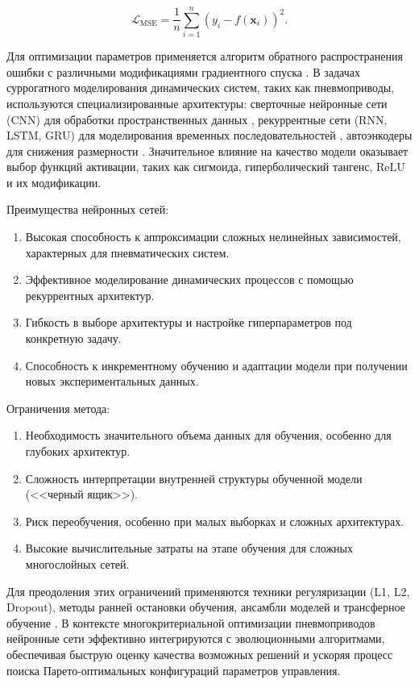 \begin{equation}
    \mathcal{L}_{\text{MSE}} = \frac{1}{n} \sum_{i=1}^{n} (y_i - f(\mathbf{x}_i))^2.
\end{equation}

Для оптимизации параметров применяется алгоритм обратного распространения ошибки с различными модификациями
градиентного спуска \cite{Ghojogh2024Learning}. В задачах суррогатного моделирования динамических систем,
таких как пневмоприводы, используются специализированные архитектуры: сверточные нейронные сети (CNN) для обработки
пространственных данных \cite{Zhu2021Spatial}, рекуррентные сети (RNN, LSTM, GRU) для моделирования временных
последовательностей \cite{Zarzycki2021LSTM}, автоэнкодеры для снижения размерности \cite{Kaur2021Variational}. Значительное
влияние на качество модели оказывает выбор функций активации, таких как сигмоида, гиперболический тангенс, ReLU и их
модификации.

Преимущества нейронных сетей:

\begin{enumerate}
    \item Высокая способность к аппроксимации сложных нелинейных зависимостей, характерных для пневматических систем.
    \item Эффективное моделирование динамических процессов с помощью рекуррентных архитектур.
    \item Гибкость в выборе архитектуры и настройке гиперпараметров под конкретную задачу.
    \item Способность к инкрементному обучению и адаптации модели при получении новых экспериментальных данных.
\end{enumerate}

Ограничения метода:

\begin{enumerate}
    \item Необходимость значительного объема данных для обучения, особенно для глубоких архитектур.
    \item Сложность интерпретации внутренней структуры обученной модели (<<черный ящик>>).
    \item Риск переобучения, особенно при малых выборках и сложных архитектурах.
    \item Высокие вычислительные затраты на этапе обучения для сложных многослойных сетей.
\end{enumerate}

Для преодоления этих ограничений применяются техники регуляризации (L1, L2, Dropout), методы ранней остановки обучения,
ансамбли моделей и трансферное обучение \cite{Farhadi2022Combining}. В контексте многокритериальной оптимизации пневмоприводов
нейронные сети эффективно интегрируются с эволюционными алгоритмами, обеспечивая быструю оценку качества возможных решений
и ускоряя процесс поиска Парето-оптимальных конфигураций параметров управления.
